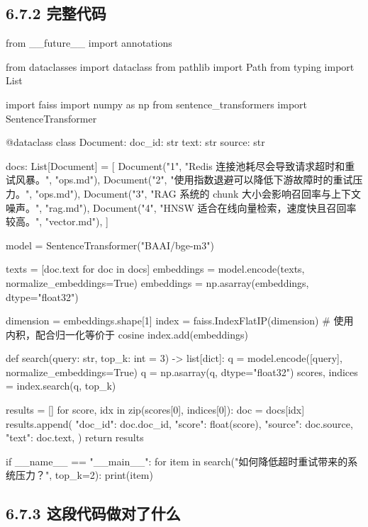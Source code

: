 \subsection{6.7.2 完整代码}

\begin{codeblock}
from __future__ import annotations

from dataclasses import dataclass
from pathlib import Path
from typing import List

import faiss
import numpy as np
from sentence_transformers import SentenceTransformer


@dataclass
class Document:
    doc_id: str
    text: str
    source: str


docs: List[Document] = [
    Document("1", "Redis 连接池耗尽会导致请求超时和重试风暴。", "ops.md"),
    Document("2", "使用指数退避可以降低下游故障时的重试压力。", "ops.md"),
    Document("3", "RAG 系统的 chunk 大小会影响召回率与上下文噪声。", "rag.md"),
    Document("4", "HNSW 适合在线向量检索，速度快且召回率较高。", "vector.md"),
]


model = SentenceTransformer("BAAI/bge-m3")

texts = [doc.text for doc in docs]
embeddings = model.encode(texts, normalize_embeddings=True)
embeddings = np.asarray(embeddings, dtype="float32")

dimension = embeddings.shape[1]
index = faiss.IndexFlatIP(dimension)  # 使用内积，配合归一化等价于 cosine
index.add(embeddings)


def search(query: str, top_k: int = 3) -> list[dict]:
    q = model.encode([query], normalize_embeddings=True)
    q = np.asarray(q, dtype="float32")
    scores, indices = index.search(q, top_k)

    results = []
    for score, idx in zip(scores[0], indices[0]):
        doc = docs[idx]
        results.append(
            {
                "doc_id": doc.doc_id,
                "score": float(score),
                "source": doc.source,
                "text": doc.text,
            }
        )
    return results


if __name__ == "__main__":
    for item in search("如何降低超时重试带来的系统压力？", top_k=2):
        print(item)
\end{codeblock}

\subsection{6.7.3 这段代码做对了什么}

